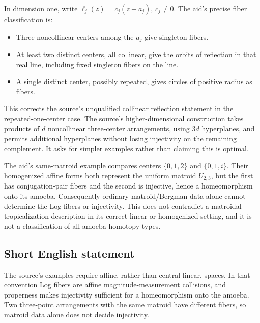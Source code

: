 \documentclass[11pt]{article}
\begin{document}
In dimension one, write \(\ell_j(z)=c_j(z-a_j)\), \(c_j\ne0\). The aid's precise fiber classification is:
\begin{itemize}
\item Three noncollinear centers among the \(a_j\) give singleton fibers.
\item At least two distinct centers, all collinear, give the orbits of reflection in that real line, including fixed singleton fibers on the line.
\item A single distinct center, possibly repeated, gives circles of positive radius as fibers.
\end{itemize}
This corrects the source's unqualified collinear reflection statement in the repeated-one-center case. The source's higher-dimensional construction takes products of \(d\) noncollinear three-center arrangements, using \(3d\) hyperplanes, and permits additional hyperplanes without losing injectivity on the remaining complement. It asks for simpler examples rather than claiming this is optimal.

The aid's same-matroid example compares centers \(\{0,1,2\}\) and \(\{0,1,i\}\). Their homogenized affine forms both represent the uniform matroid \(U_{2,3}\), but the first has conjugation-pair fibers and the second is injective, hence a homeomorphism onto its amoeba. Consequently ordinary matroid/Bergman data alone cannot determine the Log fibers or injectivity. This does not contradict a matroidal tropicalization description in its correct linear or homogenized setting, and it is not a classification of all amoeba homotopy types.
\subsection{Short English statement}
The source's examples require affine, rather than central linear, spaces. In that convention Log fibers are affine magnitude-measurement collisions, and properness makes injectivity sufficient for a homeomorphism onto the amoeba. Two three-point arrangements with the same matroid have different fibers, so matroid data alone does not decide injectivity.
\end{document}
